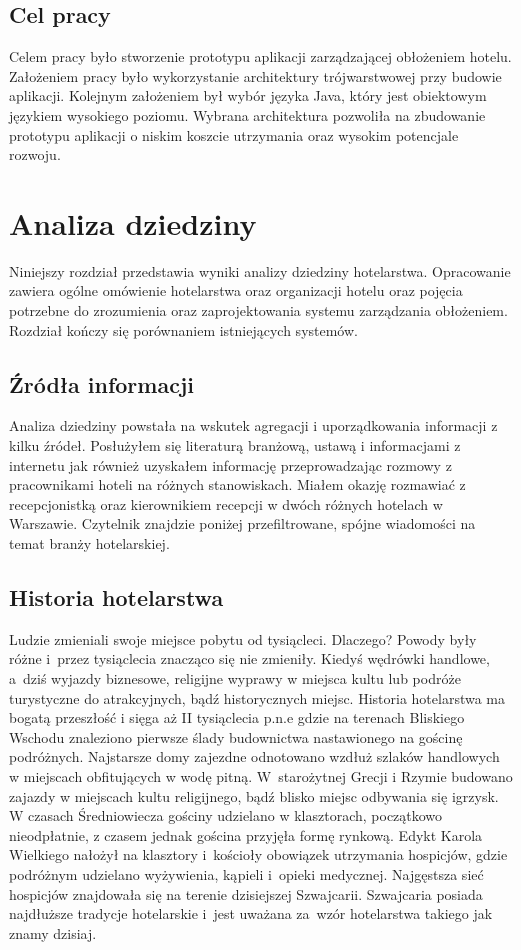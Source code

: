 \documentclass[a4paper,onecolumn,oneside,11pt,wide,floatssmall]{mwrep}
\theoremstyle{definition}
\theoremstyle{plain}%
\theoremstyle{remark}
\begin{document}
\section{Cel pracy}
Celem pracy było stworzenie prototypu aplikacji zarządzającej obłożeniem hotelu. Założeniem pracy było wykorzystanie architektury trójwarstwowej przy budowie aplikacji. Kolejnym założeniem był wybór języka Java, który jest obiektowym językiem wysokiego poziomu. Wybrana architektura pozwoliła na zbudowanie prototypu aplikacji o niskim koszcie utrzymania oraz wysokim potencjale rozwoju.

\chapter{Analiza dziedziny} 
\label{analiza-dziedziny}
Niniejszy rozdział przedstawia wyniki analizy dziedziny hotelarstwa. Opracowanie zawiera ogólne omówienie hotelarstwa oraz organizacji hotelu oraz pojęcia potrzebne do zrozumienia oraz zaprojektowania systemu zarządzania obłożeniem. Rozdział kończy się porównaniem istniejących systemów.

\section{Źródła informacji}

Analiza dziedziny powstała na wskutek agregacji i uporządkowania informacji 
z kilku źródeł. Posłużyłem się literaturą branżową, ustawą i informacjami z 
internetu jak również uzyskałem informację przeprowadzając rozmowy z 
pracownikami hoteli na różnych stanowiskach. Miałem okazję rozmawiać z 
recepcjonistką oraz kierownikiem recepcji w dwóch różnych hotelach w 
Warszawie. Czytelnik znajdzie poniżej przefiltrowane, spójne wiadomości na
 temat branży hotelarskiej.


\section{Historia hotelarstwa} 

Ludzie zmieniali swoje miejsce pobytu od tysiącleci. Dlaczego? Powody były różne 
\mbox{i przez} tysiąclecia znacząco się nie zmieniły. Kiedyś wędrówki handlowe, \mbox{a 
dziś} wyjazdy biznesowe, religijne wyprawy w miejsca kultu lub podróże 
turystyczne do atrakcyjnych, bądź historycznych miejsc. Historia 
hotelarstwa ma bogatą przeszłość i sięga aż II tysiąclecia p.n.e gdzie na 
terenach Bliskiego Wschodu znaleziono pierwsze ślady budownictwa 
nastawionego na gościnę podróżnych. Najstarsze domy zajezdne odnotowano 
wzdłuż szlaków handlowych w miejscach obfitujących w wodę pitną. \mbox{W 
starożytnej} Grecji i Rzymie budowano zajazdy w miejscach kultu religijnego, 
bądź blisko miejsc odbywania się igrzysk. W czasach Średniowiecza gościny udzielano 
w klasztorach, początkowo nieodpłatnie, z czasem jednak gościna przyjęła 
formę rynkową. Edykt Karola Wielkiego nałożył na klasztory \mbox{i kościoły} 
obowiązek utrzymania hospicjów, gdzie podróżnym udzielano wyżywienia, 
kąpieli \mbox{i opieki} medycznej. Najgęstsza sieć hospicjów znajdowała się na 
terenie dzisiejszej Szwajcarii. Szwajcaria posiada najdłuższe tradycje 
hotelarskie \mbox{i jest} uważana \mbox{za wzór} hotelarstwa takiego jak znamy dzisiaj.
\end{document}
